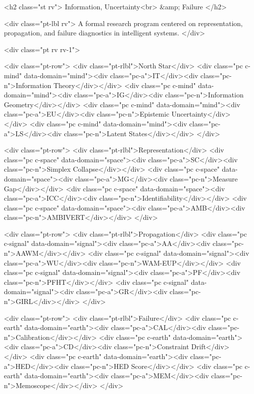   <h2 class="st rv">
    Information, Uncertainty<br>
    &amp; Failure
  </h2>

  <div class="pt-lbl rv">
    A formal research program centered on representation, propagation, and failure diagnostics in intelligent systems.
  </div>

  <div class="pt rv rv-1">
    
    <div class="pt-row">
      <div class="pt-rlbl">North Star</div>
      <div class="pc c-mind" data-domain="mind"><div class="pc-a">IT</div><div class="pc-n">Information Theory</div></div>
      <div class="pc c-mind" data-domain="mind"><div class="pc-a">IG</div><div class="pc-n">Information Geometry</div></div>
      <div class="pc c-mind" data-domain="mind"><div class="pc-a">EU</div><div class="pc-n">Epistemic Uncertainty</div></div>
      <div class="pc c-mind" data-domain="mind"><div class="pc-a">LS</div><div class="pc-n">Latent States</div></div>
    </div>
    
    <div class="pt-row">
      <div class="pt-rlbl">Representation</div>
      <div class="pc c-space" data-domain="space"><div class="pc-a">SC</div><div class="pc-n">Simplex Collapse</div></div>
      <div class="pc c-space" data-domain="space"><div class="pc-a">MG</div><div class="pc-n">Measure Gap</div></div>
      <div class="pc c-space" data-domain="space"><div class="pc-a">ICC</div><div class="pc-n">Identifiability</div></div>
      <div class="pc c-space" data-domain="space"><div class="pc-a">AMB</div><div class="pc-n">AMBIVERT</div></div>
    </div>
    
    <div class="pt-row">
      <div class="pt-rlbl">Propagation</div>
      <div class="pc c-signal" data-domain="signal"><div class="pc-a">AA</div><div class="pc-n">AAWM</div></div>
      <div class="pc c-signal" data-domain="signal"><div class="pc-a">WU</div><div class="pc-n">WAM-EUP</div></div>
      <div class="pc c-signal" data-domain="signal"><div class="pc-a">PF</div><div class="pc-n">PFHT</div></div>
      <div class="pc c-signal" data-domain="signal"><div class="pc-a">GR</div><div class="pc-n">GIRL</div></div>
    </div>
    
    <div class="pt-row">
      <div class="pt-rlbl">Failure</div>
      <div class="pc c-earth" data-domain="earth"><div class="pc-a">CAL</div><div class="pc-n">Calibration</div></div>
      <div class="pc c-earth" data-domain="earth"><div class="pc-a">CD</div><div class="pc-n">Constraint Drift</div></div>
      <div class="pc c-earth" data-domain="earth"><div class="pc-a">HED</div><div class="pc-n">HED Score</div></div>
      <div class="pc c-earth" data-domain="earth"><div class="pc-a">MEM</div><div class="pc-n">Memoscope</div></div>
    </div>
    
